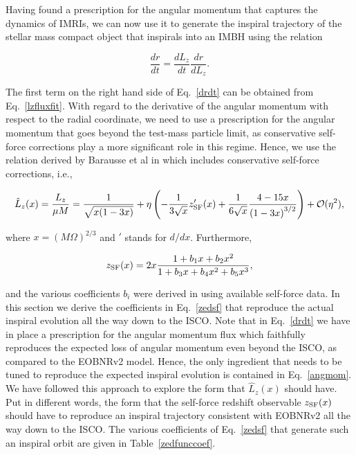 Having found a prescription for the angular momentum that captures the dynamics of IMRIs, we can now use it to generate the inspiral trajectory of the stellar mass compact object that inspirals into an IMBH using the relation 

\begin{equation}
\frac{d r}{d t}= \frac{d L_z}{d t}\frac{d r}{d L_z}.
\label{drdt}
\end{equation}

\noindent  The first term on the right hand side of Eq.~\eqref{drdt} can be obtained from Eq.~\eqref{lzfluxfit}. With regard to the derivative of the angular momentum with respect to the radial coordinate, we need to use a prescription for the angular momentum that goes beyond the test-mass particle limit, as conservative self-force corrections play a more significant role in this regime. Hence, we use the relation derived by Barausse et al in \cite{barus} which includes conservative self-force corrections, i.e.,

\begin{equation}
\hat{L}_z (x)= \frac{L_z}{\mu M}= \frac{1}{\sqrt{x(1-3x)}} + \eta\left(-\frac{1}{3 \sqrt{x}} z'_{\rm SF}(x) + \frac{1}{6\sqrt{x}}\frac{4-15x}{\left(1-3x\right)^{3/2}}\right) + {\cal O} (\eta^2),
\label{angmom}
\end{equation}

\noindent where \(x=(M\Omega)^{2/3}\) and \('\) stands for \(d/dx\). Furthermore,

\begin{equation}
z_{\rm SF} (x)= 2x \frac{1+b_1 x+b_2 x^2}{1+b_3x +b_4 x^2 + b_5 x^3},
\label{zedsf}
\end{equation}

\noindent and the various coefficients \(b_i\) were derived in \cite{barus} using available self-force data. In this section we derive the coefficients in Eq.~\eqref{zedsf} that reproduce the actual inspiral evolution all the way down to the ISCO. Note that in Eq.~\eqref{drdt} we have in place a prescription for the angular momentum flux which faithfully reproduces the expected loss of angular momentum even beyond the ISCO,  as compared to the EOBNRv2 model. Hence, the only ingredient that needs to be tuned to reproduce the expected inspiral evolution is contained in Eq.~\eqref{angmom}. We have followed this approach to explore the form that \(\hat{L}_z (x)\) should have. Put in different words, the form that the self-force redshift observable \(z_{\rm SF} (x)\) should have to reproduce an inspiral trajectory consistent with EOBNRv2 all the way down to the ISCO.  The various coefficients of Eq.~\eqref{zedsf} that generate such an inspiral orbit are given in Table~\ref{zedfunccoef}.

